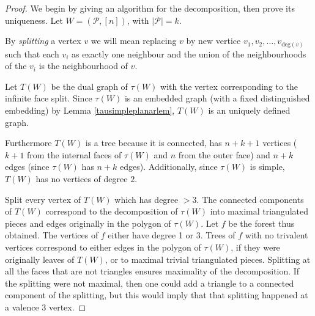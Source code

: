 \documentclass[11pt]{article}
\newcommand{\hlfix}[2]{\texthl{#1}\todo{#2}}
\newcommand{\cP}{\mathcal{P}}
\theoremstyle{remark}
\theoremstyle{definition}
\begin{document}
\begin{proof}
We begin by giving an algorithm for the decomposition, then prove its uniqueness. Let $W = (\cP, [n])$, with $|\cP| = k$.

By \emph{splitting} a vertex $v$ we will mean replacing $v$ by new vertice $v_1, v_2,\ldots, v_{\text{deg}(v)}$ such that each $v_i$ as exactly one neighbour and the union of the neighbourhoods of the $v_i$ is the neighbourhood of $v$.

Let $T(W)$ be the dual graph of $\tau(W)$ with the vertex corresponding to the infinite face split.
Since $\tau(W)$ is an embedded graph (with a fixed distinguished embedding) by Lemma \ref{tausimpleplanarlem}, $T(W)$ is an uniquely defined graph.

Furthermore $T(W)$ is a tree because it is connected, has $n+k+1$ vertices ($k+1$ from the internal faces of $\tau(W)$ and $n$ from the outer face) and $n+k$ edges (since $\tau(W)$ has $n+k$ edges).  Additionally, since $\tau(W)$ is simple, $T(W)$ has no vertices of degree $2$.  


Split every vertex of $T(W)$ which has degree $>3$.
The connected components of $T(W)$ correspond to the decomposition of $\tau(W)$ into maximal triangulated pieces and edges originally in the polygon of $\tau(W)$.  Let $f$ be the forest thus obtained.
The vertices of $f$ either have degree 1 or 3.
Trees of $f$ with no trivalent vertices correspond to either edges in the polygon of $\tau(W)$, if they were originally leaves of $T(W)$, or to maximal trivial triangulated pieces.
Splitting at all the faces that are not triangles ensures maximality of the decomposition. If the splitting were not maximal, then one could add a triangle to a connected component of the splitting, but this would imply that that splitting happened at a valence $3$ vertex.


\end{proof}
\end{document}
